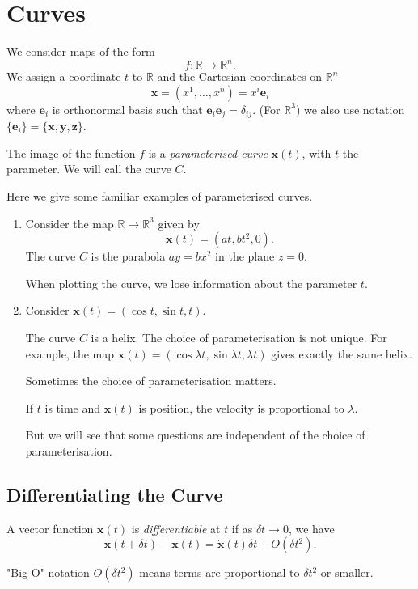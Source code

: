 \section{Curves}
We consider maps of the form
\[
    f:\mathbb{R}\to \mathbb{R}^n.
\]
We assign a coordinate \(t\) to \(\mathbb{R}\) and the Cartesian coordinates on \(\mathbb{R}^n\)
\[
    \mathbf{x} = (x^1, \ldots, x^n ) = x^i \mathbf{e}_i
\]
where \(\mathbf{e} _i\) is orthonormal basis such that \(\mathbf{e} _i \mathbf{e} _j = \delta_{ij}\). (For \(\mathbb{R}^3\)) we also use notation \(\{\mathbf{e} _i\} = \{\mathbf{x} ,\mathbf{y} ,\mathbf{z} \}\).

The image of the function \(f\) is a \textit{parameterised curve} \(\mathbf{x} (t)\), with \(t\) the parameter. We will call the curve \(C\).

\begin{example}
    Here we give some familiar examples of parameterised curves.
    \begin{enumerate}
        \item Consider the map \(\mathbb{R}\to\mathbb{R}^3\) given by
        \[
            \mathbf{x} (t) = (at, bt^2, 0).
        \]
        The curve \(C\) is the parabola \(ay = bx^2\) in the plane \(z = 0\).
        \begin{note}
            When plotting the curve, we lose information about the parameter \(t\).
        \end{note}
        \item Consider \(\mathbf{x} (t) = (\cos t, \sin t, t)\).

        The curve \(C\) is a helix. The choice of parameterisation is not unique. For example, the map \(\mathbf{x} (t) = (\cos \lambda t,\sin \lambda t, \lambda t)\) gives exactly the same helix.

        Sometimes the choice of parameterisation matters.
        \begin{example}
            If \(t\)  is time and \(\mathbf{x} (t)\) is position, the velocity is proportional to \(\lambda\).
        \end{example}
        But we will see that some questions are independent of the choice of parameterisation.
    \end{enumerate}
    \subsection{Differentiating the Curve}
    A vector function \(\mathbf{x} (t)\) is \textit{differentiable} at \(t\) if as \(\delta t \to 0\), we have
    \[
        \mathbf{x} (t + \delta t) - \mathbf{x} (t) = \dot{\textbf{x} }(t)\delta t + O(\delta t^2).
    \]
    \begin{note}
        "Big-O" notation \(O(\delta t^2)\) means terms are proportional to \(\delta t^2\) or smaller.
    \end{note}


\end{example}
